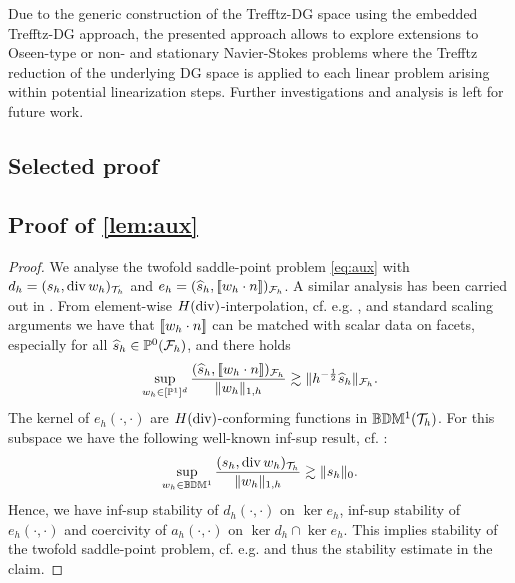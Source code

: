 \documentclass[sn-mathphys,Numbered]{sn-jnl}%
\renewcommand{\hat}[1]{\widehat{#1}}
\theoremstyle{remark}%
\theoremstyle{definition}%
\begin{document}
Due to the generic construction of the Trefftz-DG space using the embedded Trefftz-DG approach, the presented approach allows to explore extensions to Oseen-type or non- and stationary Navier-Stokes problems where the Trefftz reduction of the underlying DG space is applied to each linear problem arising within potential linearization steps. Further investigations and analysis is left for future work.
\begin{appendices}

\section{Selected proof}
\subsection{Proof of \cref{lem:aux}} \label{sec:proof:aux}
\begin{proof}
We analyse the twofold saddle-point problem \eqref{eq:aux} with $d_h = (s_h,\operatorname{\mathrm{div}} w_h)_{\mathcal{T}_h}$ and $e_h = (\hat{s}_h, \jmp{w_h \cdot n})_\Fh$. A similar analysis has been carried out in \cite[Lemma 4.3.6]{alemanmaster}. From element-wise $H(\operatorname{\mathrm{div}})$-interpolation, cf. e.g. \cite{brezzi}, and standard scaling arguments we have that $[\![w_h\cdot n]\!]$ can be matched with scalar data on facets, especially for all $\hat{s}_h \in \PP^0(\Fh)$, and there holds
\begin{equation}
  \sup_{w_h \in [\PP^1]^d} \frac{(\hat{s}_h, \jmp{w_h \cdot n})_\Fh}{\nrm{w_h}_{1,h}} \gtrsim \nrm{h^{-\frac12}\hat{s}_h}_{\Fh}.
\end{equation}
The kernel of $e_h(\cdot,\cdot)$ are $H(\operatorname{\mathrm{div}})$-conforming functions in $\mathbb{B}\mathbb{D}\mathbb{M}^1({\mathcal{T}_h})$. For this subspace we have the following well-known inf-sup result, cf. \cite{hansbolarson02,cockburn2007note}:
\begin{equation}
  \sup_{w_h \in \mathbb{B}\mathbb{D}\mathbb{M}^1} \frac{(s_h, \operatorname{\mathrm{div}} w_h)_{\mathcal{T}_h}}{\Vert w_h \Vert_{1,h}} \gtrsim \Vert s_h \Vert_{0}.
\end{equation}
Hence, we have inf-sup stability of $d_h(\cdot,\cdot)$ on $\ker e_h$, inf-sup stability of $e_h(\cdot,\cdot)$ and coercivity of $a_h(\cdot,\cdot)$ on $\ker d_h \cap \ker e_h$. This implies stability of the twofold saddle-point problem, cf. e.g. \cite{saddle} and thus the stability estimate in the claim.
\end{proof}



\end{appendices}
\end{document}
